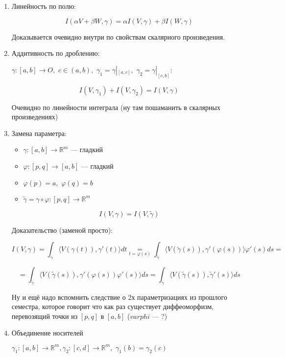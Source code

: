 \documentclass{article}
\def\dbl{\,\,}
\def\sk#1#2{\langle #1, #2 \rangle}
\begin{document}
\begin{enumerate}
    \item Линейность по полю:
    
    \[I(\alpha V + \beta W, \gamma) = \alpha I(V, \gamma) + \beta I(W, \gamma)\]

    Доказывается очевидно внутри по свойствам скалярного произведения.

    \item Аддитивность по дроблению:
    
    $\gamma: [a, b] \rightarrow O, \dbl c \in (a, b), \dbl \gamma_1 = \gamma|_{[a, c]}, \dbl \gamma_2 = \gamma|_{[c, b]}$:

    \[I(V, \gamma_1) + I(V, \gamma_2) = I(V, \gamma)\]

    Очевидно по линейности интеграла (ну там пошаманить в скалярных произведениях)

    \item Замена параметра:
    
    \begin{itemize}
        \item $\gamma: [a, b] \rightarrow \mathbb{R}^m$ --- гладкий
        \item $\varphi: [p, q] \rightarrow [a, b]$ --- гладкий
        \item $\varphi(p) = a, \dbl \varphi(q) = b$
        \item $\tilde{\gamma} = \gamma \circ \varphi: [p, q] \rightarrow \mathbb{R}^m$
    \end{itemize}

    \[I(V, \gamma) = I(V, \tilde{\gamma})\]

    Доказательство (заменой просто):

    \[I(V, \gamma) = \int_{\gamma} \sk{V(\gamma(t))}{\gamma'(t)} dt \underset{t = \varphi(s)}{=} \int_{\tilde{\gamma}} \sk{V(\tilde{\gamma}(s))}{\gamma'(\varphi(s))} \varphi'(s)ds = \] 
    
    \[ = \int_{\tilde{\gamma}} \sk{V(\tilde{\gamma}(s))}{\gamma'(\varphi(s))\varphi'(s)}ds = \int_{\tilde{\gamma}} \sk{V(\tilde{\gamma}(s))}{\tilde{\gamma}'(s)}ds\]

    Ну и ещё надо вспомнить следствие о 2х параметризациях из прошлого семестра, которое говорит что как раз существует диффеоморфизм, перевозящий точки из $[p, q]$ в $[a, b]$ ($varphi$ --- ?)

    \item Объединение носителей
    
    $\gamma_1: [a, b] \rightarrow \mathbb{R}^m, \gamma_2: [c, d] \rightarrow \mathbb{R}^m, \dbl \gamma_1(b) = \gamma_2(c)$


\end{enumerate}
\end{document}
